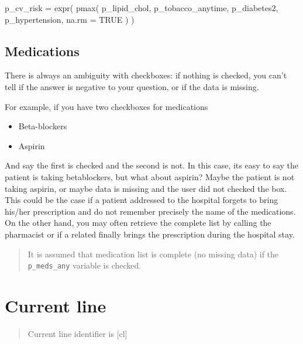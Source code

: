 \documentclass[
]{book}
\newenvironment{Shaded}{\begin{snugshade}}{\end{snugshade}}
\newcommand{\AttributeTok}[1]{\textcolor[rgb]{0.77,0.63,0.00}{#1}}
\newcommand{\ConstantTok}[1]{\textcolor[rgb]{0.00,0.00,0.00}{#1}}
\newcommand{\FunctionTok}[1]{\textcolor[rgb]{0.00,0.00,0.00}{#1}}
\newcommand{\NormalTok}[1]{#1}
\newcommand{\OtherTok}[1]{\textcolor[rgb]{0.56,0.35,0.01}{#1}}
\begin{document}
\begin{Shaded}
\begin{Highlighting}[]
\NormalTok{p\_cv\_risk }\OtherTok{=} \FunctionTok{expr}\NormalTok{(}
  \FunctionTok{pmax}\NormalTok{(}
\NormalTok{      p\_lipid\_chol,}
\NormalTok{      p\_tobacco\_anytime,}
\NormalTok{      p\_diabetes2,}
\NormalTok{      p\_hypertension,}
      \AttributeTok{na.rm =} \ConstantTok{TRUE}
\NormalTok{    )}
\NormalTok{  )}
\end{Highlighting}
\end{Shaded}

\hypertarget{medications}{%
\section{Medications}\label{medications}}

There is always an ambiguity with checkboxes: if nothing is checked, you can't tell if the answer is negative to your question, or if the data is missing.

For example, if you have two checkboxes for medications

\begin{itemize}
\item
  Beta-blockers
\item
  Aspirin
\end{itemize}

And say the first is checked and the second is not. In this case, its easy to say the patient is taking betablockers, but what about aspirin? Maybe the patient is not taking aspirin, or maybe data is missing and the user did not checked the box. This could be the case if a patient addressed to the hospital forgets to bring his/her prescription and do not remember precisely the name of the medications. On the other hand, you may often retrieve the complete list by calling the pharmacist or if a related finally brings the prescription during the hospital stay.

\begin{quote}
It is assumed that medication list is complete (no missing data) if the \texttt{p\_meds\_any} variable is checked.
\end{quote}

\hypertarget{current_line}{%
\chapter{Current line}\label{current_line}}

\begin{quote}
Current line identifier is {[}cl{]}
\end{quote}
\end{document}
